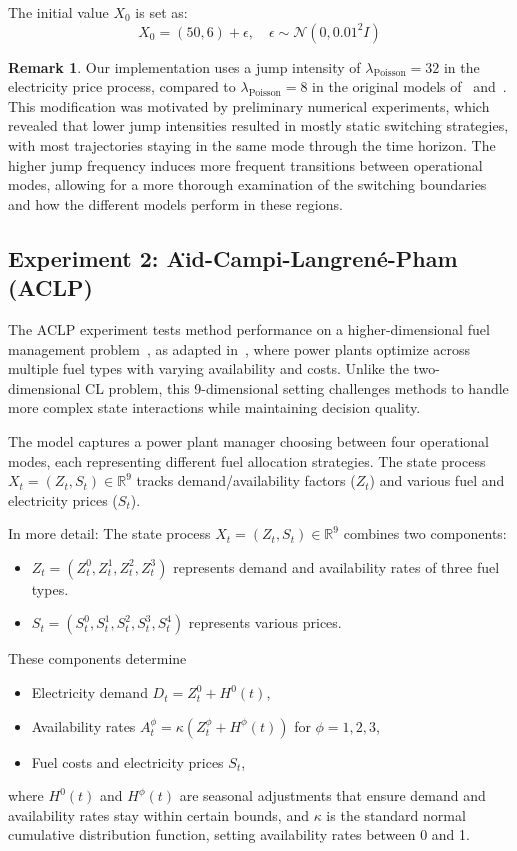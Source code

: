 \documentclass[11pt,reqno,a4paper]{amsart}
\theoremstyle{definition}
\newtheorem{remark}[theorem]{Remark}
\numberwithin{equation}{section}
\DeclareMathOperator{\1}{\mathbbm{1}}
\begin{document}
The initial value $X_0$ is set as:
\begin{equation}\label{eq:carmona:x0}
  X_0 = (50, 6) + \epsilon, \quad \epsilon \sim \mathcal{N}(0, 0.01^2I)
\end{equation}

\begin{remark}
  Our implementation uses a jump intensity of $\lambda_\text{Poisson} = 32$ in the electricity price process, compared to $\lambda_\text{Poisson} = 8$ in the original models of~\cite{carmona2008pricing} and~\cite{bayraktar2023neural}. This modification was motivated by preliminary numerical experiments, which revealed that lower jump intensities resulted in mostly static switching strategies, with most trajectories staying in the same mode through the time horizon. The higher jump frequency induces more frequent transitions between operational modes, allowing for a more thorough examination of the switching boundaries and how the different models perform in these regions.
\end{remark}
\subsection{Experiment 2: A{\"\i}d-Campi-Langrené-Pham (ACLP)}\label{sec:numerical:aid}
The ACLP experiment tests method performance on a higher-dimensional fuel management problem~\cite{ACLP12}, as adapted in~\cite{bayraktar2023neural}, where power plants optimize across multiple fuel types with varying availability and costs. Unlike the two-dimensional CL problem, this 9-dimensional setting challenges methods to handle more complex state interactions while maintaining decision quality.

The model captures a power plant manager choosing between four operational modes, each representing different fuel allocation strategies. The state process $X_t=(Z_t,S_t) \in \mathbb{R}^9$ tracks demand/availability factors ($Z_t$) and various fuel and electricity prices ($S_t$).

In more detail: The state process $X_t=(Z_t,S_t) \in \mathbb{R}^9$ combines two components:
\begin{itemize}
  \item $Z_t = (Z^0_t, Z^1_t, Z^2_t, Z^3_t)$ represents demand and availability rates of three fuel types.
  \item $S_t = (S^0_t, S^1_t, S^2_t, S^3_t, S^4_t)$ represents various prices.
\end{itemize}
These components determine
\begin{itemize}
  \item Electricity demand $D_t = Z^0_t + H^0(t)$,
  \item Availability rates $A_t^\phi = \kappa(Z^\phi_t + H^\phi(t))$ for $\phi = 1,2,3$,
  \item Fuel costs and electricity prices $S_t$,
\end{itemize}
where $H^0(t)$ and $H^\phi(t)$ are seasonal adjustments that ensure demand and availability rates stay within certain bounds, and $\kappa$ is the standard normal cumulative distribution function, setting availability rates between 0 and 1.
\end{document}
